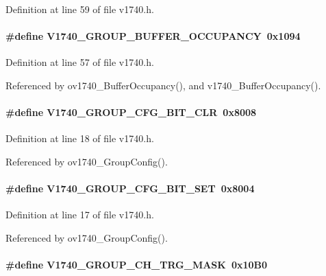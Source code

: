 Definition at line 59 of file v1740.h.
\paragraph[{V1740\_\-GROUP\_\-BUFFER\_\-OCCUPANCY}]{\setlength{\rightskip}{0pt plus 5cm}\#define V1740\_\-GROUP\_\-BUFFER\_\-OCCUPANCY~0x1094}\hfill\label{v1740_8h_a7d214a958510190a255dfc13f4eb8653}


Definition at line 57 of file v1740.h.

Referenced by ov1740\_\-BufferOccupancy(), and v1740\_\-BufferOccupancy().
\paragraph[{V1740\_\-GROUP\_\-CFG\_\-BIT\_\-CLR}]{\setlength{\rightskip}{0pt plus 5cm}\#define V1740\_\-GROUP\_\-CFG\_\-BIT\_\-CLR~0x8008}\hfill\label{v1740_8h_aa3bcddea34bc5f278e5c40e3939b3367}


Definition at line 18 of file v1740.h.

Referenced by ov1740\_\-GroupConfig().
\paragraph[{V1740\_\-GROUP\_\-CFG\_\-BIT\_\-SET}]{\setlength{\rightskip}{0pt plus 5cm}\#define V1740\_\-GROUP\_\-CFG\_\-BIT\_\-SET~0x8004}\hfill\label{v1740_8h_a4e68b3be53645bbd1a3b278fdf13d0a4}


Definition at line 17 of file v1740.h.

Referenced by ov1740\_\-GroupConfig().
\paragraph[{V1740\_\-GROUP\_\-CH\_\-TRG\_\-MASK}]{\setlength{\rightskip}{0pt plus 5cm}\#define V1740\_\-GROUP\_\-CH\_\-TRG\_\-MASK~0x10B0}\hfill\label{v1740_8h_a2a14f70a2b19185d0825ffba7f3a1ed1}


